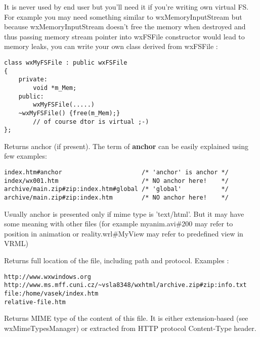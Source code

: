 It is never used by end user but you'll need it if
you're writing own virtual FS. For example you may need something
similar to wxMemoryInputStream but because wxMemoryInputStream
doesn't free the memory when destroyed and thus passing memory stream
pointer into wxFSFile constructor would lead to memory leaks, you
can write your own class derived from wxFSFile :

\begin{verbatim}
class wxMyFSFile : public wxFSFile
{
    private:
        void *m_Mem;
    public:
        wxMyFSFile(.....)
	~wxMyFSFile() {free(m_Mem);}
	    // of course dtor is virtual ;-)
};
\end{verbatim}

\label{wxfsfilegetanchor}


Returns anchor (if present). The term of {\bf anchor} can be easily
explained using few examples:

\begin{verbatim}
index.htm#anchor                      /* 'anchor' is anchor */
index/wx001.htm                       /* NO anchor here!    */
archive/main.zip#zip:index.htm#global /* 'global'           */
archive/main.zip#zip:index.htm        /* NO anchor here!    */
\end{verbatim}

Usually anchor is presented only if mime type is 'text/html'.
But it may have some meaning with other files
(for example myanim.avi\#200 may refer to position in animation
or reality.wrl\#MyView may refer to predefined view in VRML)

\label{wxfsfilegetlocation}


Returns full location of the file, including path and protocol. 
Examples : 

\begin{verbatim}
http://www.wxwindows.org
http://www.ms.mff.cuni.cz/~vsla8348/wxhtml/archive.zip#zip:info.txt
file:/home/vasek/index.htm
relative-file.htm
\end{verbatim}

\label{wxfsfilegetmimetype}


Returns MIME type of the content of this file. It is either
extension-based (see wxMimeTypesManager) or extracted from
HTTP protocol Content-Type header.

